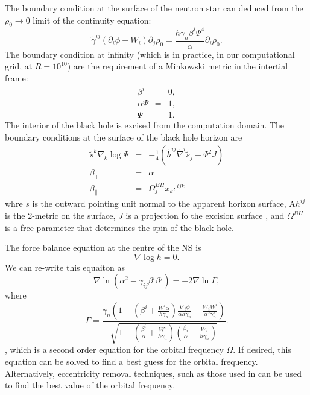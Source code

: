 The boundary condition at the surface of the neutron star can deduced from the $\rho_0\rightarrow 0$ limit of the continuity equation:
\begin{equation}
\tilde{\gamma}^{ij}\left(\partial_i\phi+W_i\right)\partial_j\rho_0=\frac{h\gamma_n\beta^i\Psi^4}{\alpha}\partial_i\rho_0.
\end{equation}
The boundary condition at infinity (which is in practice, in our computational grid, at $R=10^{10}$) are the requirement of a Minkowski metric in the intertial frame:
\begin{eqnarray}
\beta^i&=&0,\\
\alpha\Psi &=& 1,\\
\Psi &=&1.
\end{eqnarray}
The interior of the black hole is excised from the computation domain. The boundary conditions at the surface of the black hole horizon are 
\begin{eqnarray}
\label{eq:BhBoundary}
\tilde{s}^k\nabla_k\log\Psi&=&-\frac{1}{4}\left(\tilde{h}^{ij}\tilde{\nabla}^i\tilde{s}_j-\Psi^2J\right) \\
\label{eq:BhBoundary2}
\beta_{\perp}&=&\alpha \\
\label{eq:BhBoundary3}
\beta_{\parallel}&=&\Omega_{j}^{BH}x_k\epsilon^{ijk}
\end{eqnarray}
whre $s$ is the outward pointing unit normal to the apparent horizon
surface, A$h^{ij}$ is the 2-metric on the surface, $J$ is a projection
fo the excision surface , and $\Omega^{BH}$ is a
free parameter that determines the spin of the black hole.

The force balance equation at the centre of the NS is 
\begin{equation}
\nabla\log h=0.
\end{equation}
We can re-write this equaiton as 
 \begin{equation}
\label{eq:OmegaDriver}
\nabla\ln\left(\alpha^2-\gamma_{ij}\beta^{i}\beta^{j}\right)=-2\nabla\ln\Gamma,
\end{equation}
where
\begin{equation}
\Gamma
=\frac{\gamma_n\left(1-\left(\beta^i+\frac{W^i\alpha}{h\gamma_n}\right)\frac{\nabla_i\phi}{\alpha
    h\gamma_n}- \frac{W_i W^i}{\alpha^2\gamma_n^2}\right) } { \sqrt{ 1
    - \left(\frac{\beta^i}{\alpha}+\frac{W^i}{h\gamma_n}\right)
    \left(\frac{\beta_i}{\alpha}+\frac{W_i}{h\gamma_n}\right) } } .
\end{equation}, which is a second order equation for the orbital
frequency $\Omega$. If desired, this equation can be solved to find a
best guess for the orbital frequency. Alternatively, eccentricity
removal techniques, such as those used in \cite{Tacik:2015tja} can be
used to find the best value of the orbital frequency.


